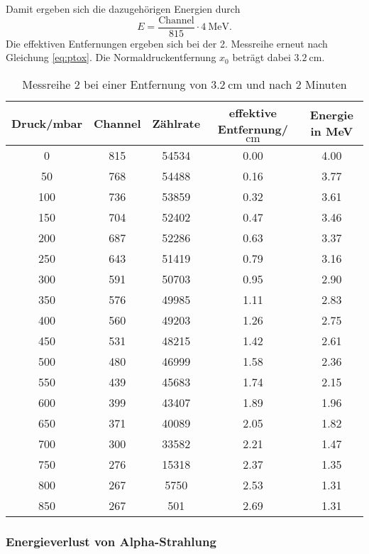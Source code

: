 Damit ergeben sich die dazugehörigen Energien durch
\begin{equation}
  E=\frac{\text{Channel}}{815}\cdot \qty{4}{\mega\electronvolt}.
  \label{eq:En2}
\end{equation} 
Die effektiven Entfernungen ergeben sich bei der 2. Messreihe erneut nach Gleichung \eqref{eq:ptox}.
Die Normaldruckentfernung $x_0$ beträgt dabei $\qty{3.2}{\centi\meter}$.
\begin{table}[H]
  \centering
  \caption{Messreihe 2 bei einer Entfernung von $\qty{3.2}{\centi\meter}$ und nach 2 Minuten}
  \label{tab:Mess2}
  \begin{tabular}{S[table-format=4] S[table-format=3] S[table-format=5] S[table-format=1.2] S[table-format=1.2]}
    \toprule
      {Druck/mbar} & {Channel} & {Zählrate}&{effektive Entfernung/$\unit{\centi\meter}$} &{Energie in MeV}\\
     & 815 & 54534 & 0.00 & 4.00 \\
      50 & 768 & 54488 & 0.16 & 3.77 \\
      100 & 736 & 53859 & 0.32 & 3.61 \\
      150 & 704 & 52402 & 0.47 & 3.46 \\
      200 & 687 & 52286 & 0.63 & 3.37 \\
      250 & 643 & 51419 & 0.79 & 3.16 \\
      300 & 591 & 50703 & 0.95 & 2.90 \\
      350 & 576 & 49985 & 1.11 & 2.83 \\
      400 & 560 & 49203 & 1.26 & 2.75 \\
      450 & 531 & 48215 & 1.42 & 2.61 \\
      500 & 480 & 46999 & 1.58 & 2.36 \\
      550 & 439 & 45683 & 1.74 & 2.15 \\
      600 & 399 & 43407 & 1.89 & 1.96 \\
      650 & 371 & 40089 & 2.05 & 1.82 \\
      700 & 300 & 33582 & 2.21 & 1.47 \\
      750 & 276 & 15318 & 2.37 & 1.35 \\
      800 & 267 & 5750 & 2.53 & 1.31 \\
      850 & 267 & 501 & 2.69 & 1.31 \\
      \bottomrule
  \end{tabular}
\end{table}
\subsubsection{Energieverlust von Alpha-Strahlung}

